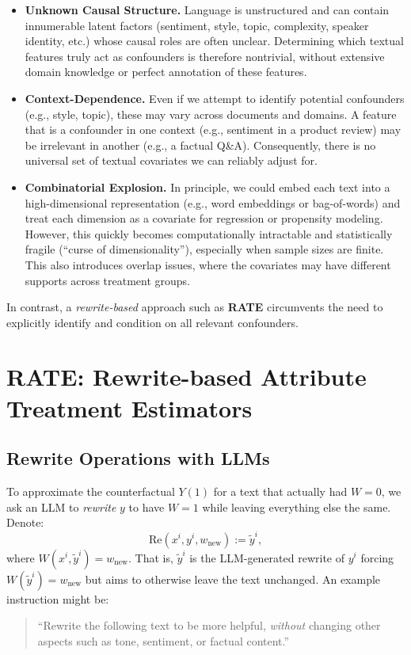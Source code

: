 \begin{itemize}
    \item \textbf{Unknown Causal Structure.} Language is unstructured and can contain innumerable latent factors (sentiment, style, topic, complexity, speaker identity, etc.) whose causal roles are often unclear. Determining which textual features truly act as confounders is therefore nontrivial, without extensive domain knowledge or perfect annotation of these features.

    \item \textbf{Context-Dependence.} Even if we attempt to identify potential confounders (e.g., style, topic), these may vary across documents and domains. A feature that is a confounder in one context (e.g., sentiment in a product review) may be irrelevant in another (e.g., a factual Q\&A). Consequently, there is no universal set of textual covariates we can reliably adjust for.

    \item \textbf{Combinatorial Explosion.} In principle, we could embed each text into a high-dimensional representation (e.g., word embeddings or bag-of-words) and treat each dimension as a covariate for regression or propensity modeling. However, this quickly becomes computationally intractable and statistically fragile (``curse of dimensionality''), especially when sample sizes are finite. This also introduces overlap issues, where the covariates may have different supports across treatment groups.

\end{itemize}

In contrast, a \emph{rewrite-based} approach such as \textbf{RATE} circumvents the need to explicitly identify and condition on all relevant confounders.

\section{RATE: Rewrite-based Attribute Treatment Estimators}
\label{sec:rate}

\subsection{Rewrite Operations with LLMs}
To approximate the counterfactual $Y(1)$ for a text that actually had $W=0$, we ask an LLM to \emph{rewrite} $y$ to have $W=1$ while leaving everything else the same. Denote:
\[
\text{Re}(x^i, y^{i}, w_{\text{new}}) := \tilde{y}^{i},
\]
where $W(x^i, \tilde{y}^{i}) = w_{\text{new}}$. That is, $\tilde{y}^{i}$ is the LLM-generated rewrite of $y^{i}$ forcing $W(\tilde{y}^{i}) = w_{\text{new}}$ but aims to otherwise leave the text unchanged. An example instruction might be:
\begin{quote}
``Rewrite the following text to be more helpful, \textit{without} changing other aspects such as tone, sentiment, or factual content.''
\end{quote}

